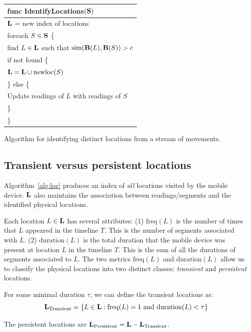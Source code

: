 \begin{algorithm}[h]
    \centering
\begin{tabular}{|l|} \hline
    func IdentifyLocations$(\mathbf{S})$ \\ \hline
    $\mathbf{L}$ = new index of locations \\
    foreach $S\in\mathbf{S}$ \{ \\
        \RRR find $L\in\mathbf{L}$ such that $\mathrm{sim}(\mathbf{B}(L), \mathbf{B}(S)) > c$ \\
        \RRR if not found \{ \\
        \RRR \RRR $\mathbf{L} = \mathbf{L}\cup \mathrm{newloc}(S)$ \\
        \RRR \} else \{ \\
        \RRR \RRR Update readings of $L$ with readings of $S$ \\
        \RRR \} \\
    \}\\ \hline
\end{tabular}
\vspace{0.4cm}
\caption{Algorithm for identifying distinct locations from a stream of
movements.}
\label{alg:loc}
\end{algorithm}

\subsection{Transient versus persistent locations}

Algorithm~\ref{alg:loc} produces an index of {\em all} locations visited by the
mobile device.  $\mathbf{L}$ also maintains the association between readings/segments
and the identified physical locations.

Each location $L\in\mathbf{L}$ has several attributes:
(1) $\mathrm{freq}(L)$ is the number of times that $L$ appeared in the timeline $T$.  This is the number of segments associated with $L$.
(2) $\mathrm{duration}(L)$ is the total duration that the mobile device was present at location $L$ in the timeline $T$.  This is the sum of all the durations of segments associated to $L$.
The two metrics $\mathrm{freq}(L)$ and $\mathrm{duration}(L)$ allow us to
classify the physical locations into two distinct classes: {\em transient} and
{\em persistent} locations.

For some minimal duration $\tau$, we can define the transient locations as:
$$\mathbf{L}_\mathrm{Transient} = \{ L\in \mathbf{L} :
    \mathrm{freq}(L) = 1\ \mathrm{and}\ \mathrm{duration}(L) < \tau
\}$$

The persistent locations are $\mathbf{L}_\mathrm{Persistent} = \mathbf{L} -
\mathbf{L}_\mathrm{Transient}$.


